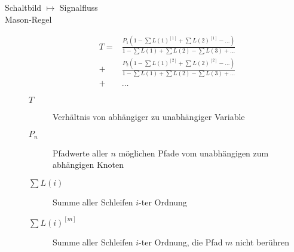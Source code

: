 
\begin{description}
\item[Schaltbild $\longmapsto$ Signalfluss] \strut
\begin{center}
\begin{circuitikz}[scale=1, every node/.style={scale=1}]

\end{circuitikz}
\end{center}

%

\item[Mason-Regel] \strut
\begin{align*}
T = &\frac{ P_1 \left( 1 - \sum L(1)^{[1]} + \sum L(2)^{[1]} - \dots \right)}{ 1 - \sum L(1) + \sum L(2) - \sum L(3) + \dots } \\
+ &\frac{P_2 \left( 1 - \sum L(1)^{[2]} + \sum L(2)^{[2]} - \dots \right)}{1 - \sum L(1) + \sum L(2) - \sum L(3) + \dots}  \\
+ &\dots
\end{align*}
\begin{description}
\item[$T$] Verhältnis von abhängiger zu unabhängiger Variable
\item[$P_n$] Pfadwerte aller $n$ möglichen Pfade vom unabhängigen zum abhängigen Knoten
\item[$\sum L(i)$] Summe aller Schleifen $i$-ter Ordnung
\item[$\sum L(i)^{[m]}$] Summe aller Schleifen $i$-ter Ordnung, die Pfad $m$ nicht berühren
\end{description}


\end{description}
